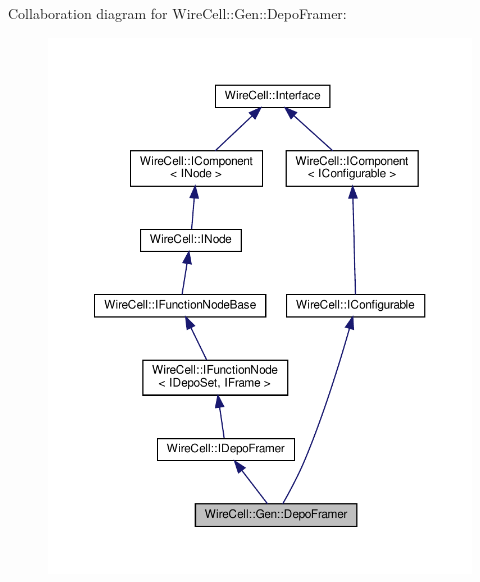Collaboration diagram for Wire\+Cell\+:\+:Gen\+:\+:Depo\+Framer\+:
\nopagebreak
\begin{figure}[H]
\begin{center}
\leavevmode
\includegraphics[width=350pt]{class_wire_cell_1_1_gen_1_1_depo_framer__coll__graph}
\end{center}
\end{figure}
